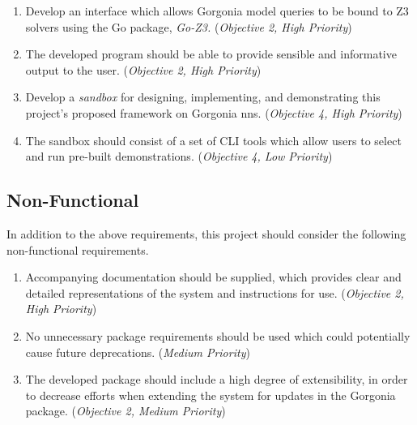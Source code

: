 \begin{enumerate}
    \item Develop an interface which allows Gorgonia model queries to be bound to Z3 solvers using the Go package, \textit{Go-Z3.} (\textit{Objective 2, High Priority})
    \item The developed program should be able to provide sensible and informative output to the user. (\textit{Objective 2, High Priority})
    \item Develop a \textit{sandbox} for designing, implementing, and demonstrating this project's proposed framework on Gorgonia \glspl{nn}. (\textit{Objective 4, High Priority})
    \item The sandbox should consist of a set of CLI tools which allow users to select and run pre-built demonstrations. (\textit{Objective 4, Low Priority})
\end{enumerate}

\subsection{Non-Functional}

In addition to the above requirements, this project should consider the following non-functional requirements.

\begin{enumerate}
    \item Accompanying documentation should be supplied, which provides clear and detailed representations of the system and instructions for use. (\textit{Objective 2, High Priority})
    \item No unnecessary package requirements should be used which could potentially cause future deprecations. (\textit{Medium Priority})
    \item The developed package should include a high degree of extensibility, in order to decrease efforts when extending the system for updates in the Gorgonia package. (\textit{Objective 2, Medium Priority})

\end{enumerate}



